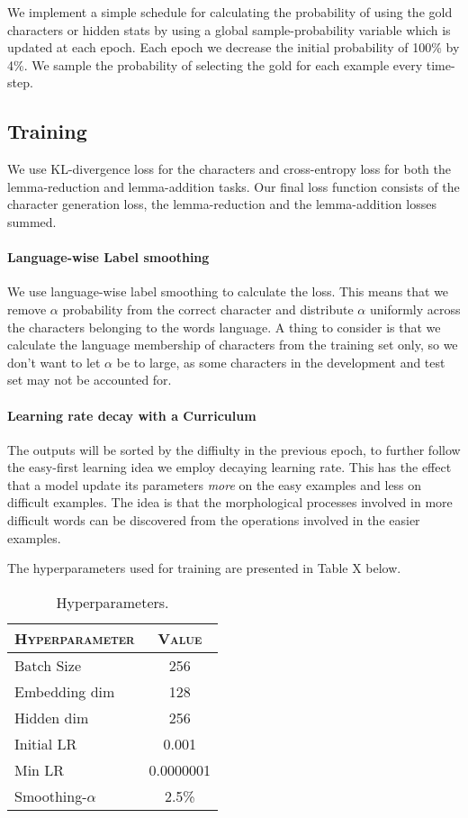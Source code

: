 \documentclass[11pt,a4paper]{article}
\begin{document}
We implement a simple schedule for calculating the probability of
using the gold characters or hidden stats by using a global
sample-probability variable which is updated at each epoch. Each epoch
we decrease the initial probability of 100\% by 4\%. We sample the
probability of selecting the gold for each example every time-step.

\subsection{Training}

We use KL-divergence loss for the characters and cross-entropy loss
for both the lemma-reduction and lemma-addition tasks. Our final loss
function consists of the character generation loss, the
lemma-reduction and the lemma-addition losses summed.

\paragraph{Language-wise Label smoothing} We use language-wise label
smoothing to calculate the loss. This means that we remove $\alpha$
probability from the correct character and distribute $\alpha$
uniformly across the characters belonging to the words language. A
thing to consider is that we calculate the language membership of
characters from the training set only, so we don't want to let
$\alpha$ be to large, as some characters in the development and test
set may not be accounted for.

\paragraph{Learning rate decay with a Curriculum} The outputs will be
sorted by the diffiulty in the previous epoch, to further follow the
easy-first learning idea we employ decaying learning rate. This has
the effect that a model update its parameters \textit{more} on the
easy examples and less on difficult examples. The idea is that the
morphological processes involved in more difficult words can be
discovered from the operations involved in the easier examples.

The hyperparameters used for training are presented in Table X below.
\begin{table}[h]	
\centering
\begin{tabular}{lc}
\textsc{Hyperparameter} & \textsc{Value} \\
  \hline
  Batch Size & 256 \\
  Embedding dim & 128 \\
  Hidden dim & 256 \\
  Initial LR & 0.001 \\
  Min LR & 0.0000001 \\
  Smoothing-$\alpha$ & 2.5\% \\
\end{tabular} 
\caption{Hyperparameters.}
\label{tab:hp}
\end{table}
\end{document}
